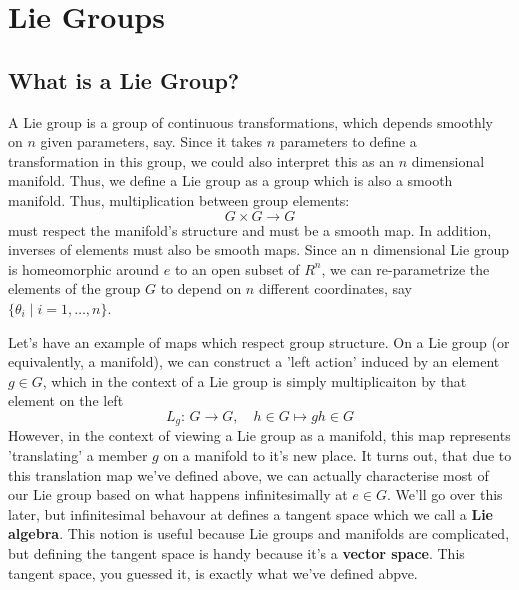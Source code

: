 \documentclass[11pt, oneside]{article}   	%
\theoremstyle{slanted}
\begin{document}
\pagebreak
\section{Lie Groups}

\subsection{What is a Lie Group?}
A Lie group is a group of continuous transformations, which depends smoothly on $n$ given parameters, say. Since it takes $n$ parameters to define a transformation in this group, we could also interpret this as an $n$ dimensional manifold. Thus, we define a Lie group as a group which is also a smooth manifold. Thus, multiplication between group elements: 
\[ 
	G \times G \rightarrow G
\]
must respect the manifold's structure and must be a smooth map. In addition, inverses of elements must also be smooth maps. 
Since an n dimensional Lie group is homeomorphic around $e$ to an open subset of $R^n$, we can re-parametrize the elements of the group $G$ to depend on $n$ different coordinates, say $\{ \theta_i \mid i = 1, \dots, n\} $. 

Let's have an example of maps which respect group structure. On a Lie group (or equivalently, a manifold), we can construct a 'left action' induced by an element $g \in G$, which in the context of a Lie group is simply multiplicaiton by that element on the left 
\[ 
	L_g: \, G \rightarrow G, \quad h \in G \mapsto gh \in G 
\] 
However, in the context of viewing a Lie group as a manifold, this map represents 'translating' a member $g$ on a manifold to it's new place. It turns out, that due to this translation map we've defined above, we can actually characterise most of our Lie group based on what happens infinitesimally at $e \in G$. We'll go over this later, but infinitesimal behavour at defines a tangent space which we call a \textbf{Lie algebra}. This notion is useful because Lie groups and manifolds are complicated, but defining the tangent space is handy because it's a \textbf{vector space}. This tangent space, you guessed it, is exactly what we've defined abpve.  
\end{document}
